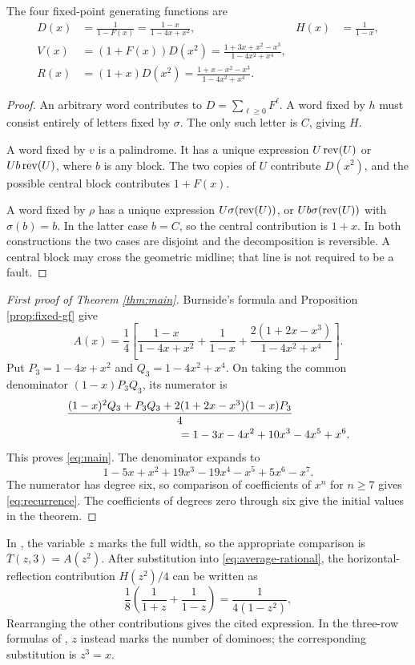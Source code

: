 \begin{proposition}\label{prop:fixed-gf}
The four fixed-point generating functions are
\begin{align}
D(x)&=\frac{1}{1-F(x)}=\frac{1-x}{1-4x+x^2},
&H(x)&=\frac{1}{1-x},\label{eq:DH}\\
V(x)&=(1+F(x))D(x^2)
 =\frac{1+3x+x^2-x^3}{1-4x^2+x^4},\label{eq:V}\\
R(x)&=(1+x)D(x^2)
 =\frac{1+x-x^2-x^3}{1-4x^2+x^4}.\label{eq:R}
\end{align}
\end{proposition}
\begin{proof}
An arbitrary word contributes to
$D=\sum_{\ell\ge0}F^\ell$.
A word fixed by $h$ must consist entirely of letters fixed by
$\sigma$. The only such letter is $C$, giving $H$.

A word fixed by $v$ is a palindrome. It has a unique expression
$U\operatorname{rev}(U)$ or $Ub\operatorname{rev}(U)$, where $b$ is any block.
The two copies of $U$ contribute $D(x^2)$, and the possible
central block contributes $1+F(x)$.

A word fixed by $\rho$ has a unique expression
$U\sigma(\operatorname{rev}(U))$, or $Ub\sigma(\operatorname{rev}(U))$ with $\sigma(b)=b$.
In the latter case $b=C$, so the central contribution is $1+x$.
In both constructions the two cases are disjoint and the
decomposition is reversible. A central block may cross the
geometric midline; that line is not required to be a fault.
\end{proof}

\begin{proof}[First proof of Theorem \ref{thm:main}]
Burnside's formula and Proposition \ref{prop:fixed-gf} give
\begin{equation}\label{eq:average-rational}
 A(x)=\frac14\left[
 \frac{1-x}{1-4x+x^2}+\frac1{1-x}
 +\frac{2(1+2x-x^3)}{1-4x^2+x^4}\right].
\end{equation}
Put $P_3=1-4x+x^2$ and $Q_3=1-4x^2+x^4$.
On taking the common denominator $(1-x)P_3Q_3$, its numerator is
\begin{align*}
 &\frac{(1-x)^2Q_3+P_3Q_3+
 2(1+2x-x^3)(1-x)P_3}{4}\\
 &\hspace{35mm}=1-3x-4x^2+10x^3-4x^5+x^6.
\end{align*}
This proves \eqref{eq:main}. The denominator expands to
\[
 1-5x+x^2+19x^3-19x^4-x^5+5x^6-x^7.
\]
The numerator has degree six, so comparison of coefficients
of $x^n$ for $n\ge7$ gives \eqref{eq:recurrence}.
The coefficients of degrees zero through six give the initial
values in the theorem.
\end{proof}

\begin{remark}
In \cite[equation (26)]{mathar2013}, the variable $z$ marks the
full width, so the appropriate comparison is
$\overline T(z,3)=A(z^2)$.
After substitution into \eqref{eq:average-rational}, the
horizontal-reflection contribution $H(z^2)/4$ can be written as
\[
 \frac18\left(\frac1{1+z}+\frac1{1-z}\right)
 =\frac1{4(1-z^2)},
\]
Rearranging the other contributions gives the cited expression.
In the three-row formulas of
\cite[equations (4)--(6)]{mathar2014}, $z$ instead marks the
number of dominoes; the corresponding substitution is $z^3=x$.
\end{remark}
